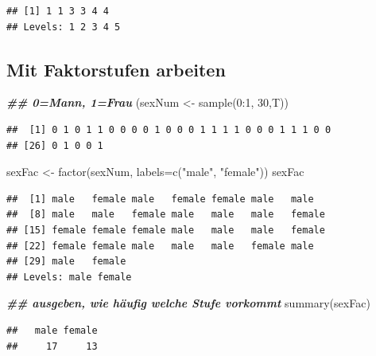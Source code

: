 \documentclass[
]{book}
\newenvironment{Shaded}{\begin{snugshade}}{\end{snugshade}}
\newcommand{\AttributeTok}[1]{\textcolor[rgb]{0.77,0.63,0.00}{#1}}
\newcommand{\DecValTok}[1]{\textcolor[rgb]{0.00,0.00,0.81}{#1}}
\newcommand{\DocumentationTok}[1]{\textcolor[rgb]{0.56,0.35,0.01}{\textbf{\textit{#1}}}}
\newcommand{\FunctionTok}[1]{\textcolor[rgb]{0.00,0.00,0.00}{#1}}
\newcommand{\NormalTok}[1]{#1}
\newcommand{\OtherTok}[1]{\textcolor[rgb]{0.56,0.35,0.01}{#1}}
\newcommand{\SpecialCharTok}[1]{\textcolor[rgb]{0.00,0.00,0.00}{#1}}
\newcommand{\StringTok}[1]{\textcolor[rgb]{0.31,0.60,0.02}{#1}}
\begin{document}
\begin{verbatim}
## [1] 1 1 3 3 4 4
## Levels: 1 2 3 4 5
\end{verbatim}

\hypertarget{mit-faktorstufen-arbeiten}{%
\subsection{Mit Faktorstufen arbeiten}\label{mit-faktorstufen-arbeiten}}

\begin{Shaded}
\begin{Highlighting}[]
\DocumentationTok{\#\# 0=Mann, 1=Frau}
\NormalTok{(sexNum }\OtherTok{\textless{}{-}} \FunctionTok{sample}\NormalTok{(}\DecValTok{0}\SpecialCharTok{:}\DecValTok{1}\NormalTok{, }\DecValTok{30}\NormalTok{,T)) }
\end{Highlighting}
\end{Shaded}

\begin{verbatim}
##  [1] 0 1 0 1 1 0 0 0 0 1 0 0 0 1 1 1 1 0 0 0 1 1 1 0 0
## [26] 0 1 0 0 1
\end{verbatim}

\begin{Shaded}
\begin{Highlighting}[]
\NormalTok{sexFac }\OtherTok{\textless{}{-}} \FunctionTok{factor}\NormalTok{(sexNum, }\AttributeTok{labels=}\FunctionTok{c}\NormalTok{(}\StringTok{"male"}\NormalTok{, }\StringTok{"female"}\NormalTok{))}
\NormalTok{sexFac}
\end{Highlighting}
\end{Shaded}

\begin{verbatim}
##  [1] male   female male   female female male   male  
##  [8] male   male   female male   male   male   female
## [15] female female female male   male   male   female
## [22] female female male   male   male   female male  
## [29] male   female
## Levels: male female
\end{verbatim}

\begin{Shaded}
\begin{Highlighting}[]
\DocumentationTok{\#\# ausgeben, wie häufig welche Stufe vorkommt}
\FunctionTok{summary}\NormalTok{(sexFac)}
\end{Highlighting}
\end{Shaded}

\begin{verbatim}
##   male female 
##     17     13
\end{verbatim}
\end{document}
